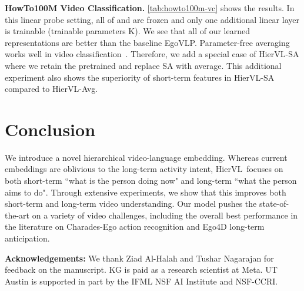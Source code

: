 \documentclass[10pt,twocolumn,letterpaper]{article}
\newcommand{\modelname}[0]{{HierVL}}
\begin{document}
\textbf{HowTo100M Video Classification.} \cref{tab:howto100m-vc} shows the results.  In this linear probe setting, all of  and  are frozen and only one additional linear layer is trainable (trainable parameters K). We see that all of our learned representations are better than the baseline EgoVLP. Parameter-free averaging works well in video classification~\cite{clip-hitchhiker}. Therefore, we add a special case of \modelname-SA where we retain the pretrained  and replace SA with average. This additional experiment also shows the superiority of short-term features  in \modelname-SA compared to \modelname-Avg.





 \section{Conclusion}
\label{sec:conclusion}

We introduce a novel hierarchical video-language embedding. Whereas current embeddings are oblivious to the long-term activity intent, \modelname~focuses on both short-term ``what is the person doing now" and long-term ``what the person aims to do". Through extensive experiments, we show that this improves both short-term and long-term video understanding.  Our model pushes the state-of-the-art on a variety of video challenges, including the overall best performance in the literature on Charades-Ego action recognition and Ego4D long-term anticipation. 



\textbf{Acknowledgements:} We thank Ziad Al-Halah and Tushar Nagarajan for feedback on the manuscript.
KG is paid as a research scientist at Meta. UT Austin is supported in part by the IFML NSF AI Institute and NSF-CCRI.



 
{\small


}
\end{document}

